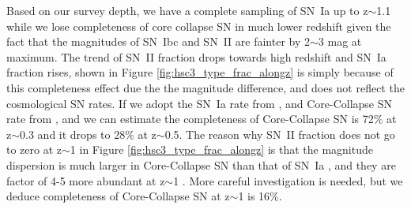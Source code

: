 \documentclass[useamsfonts]{pasj01}
\begin{document}
Based on our survey depth, we have a complete sampling of SN~Ia up to z$\sim$1.1 while we lose
completeness of core collapse SN in much lower redshift given the fact that the magnitudes of SN~Ibc and SN~II are fainter by 2$\sim$3 mag at maximum.
The trend of SN~II fraction drops towards high redshift and SN~Ia fraction rises, shown in 
Figure \ref{fig:hsc3_type_frac_alongz} is simply because of this completeness effect due the the magnitude difference, and does not reflect the cosmological SN rates.
If we adopt the SN~Ia rate from \citet{graur14a}, and Core-Collapse SN rate from \citet{strolger15a}, and we can estimate the completeness of Core-Collapse SN is 72\% at z$\sim$0.3 and it drops to 28\% at z$\sim$0.5. 
The reason why SN~II fraction does not go to zero at z$\sim$1 in Figure \ref{fig:hsc3_type_frac_alongz} is that the magnitude dispersion is much larger in Core-Collapse SN \citep[$\sigma$ $\sim$ 1.2 mag]{li11a,kessler19b} than that of SN~Ia \citep[$\sigma$ $\sim$ 0.5 mag]{rubin15a}, and they are factor of 4-5 more abundant at z$\sim$1 \citep{madau98a,hounsell18a}. 
More careful investigation is needed, but we deduce completeness of Core-Collapse SN at z$\sim$1 is 16\%.

%
%
%
\end{document}
